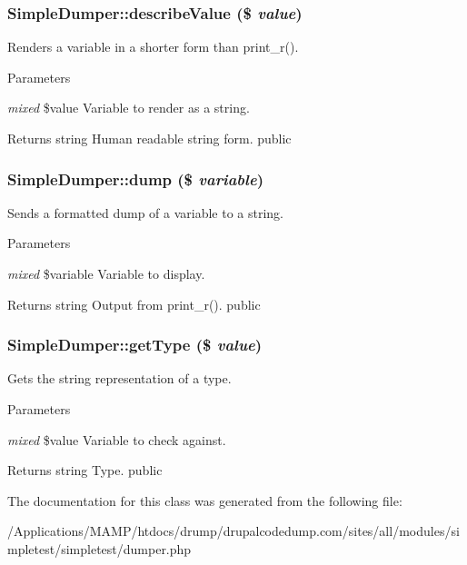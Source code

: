 \hypertarget{class_simple_dumper_a98625cdd0b0a6c6a79d241c61948d503}{
\subsubsection[{describeValue}]{\setlength{\rightskip}{0pt plus 5cm}SimpleDumper::describeValue (\$ {\em value})}}
\label{class_simple_dumper_a98625cdd0b0a6c6a79d241c61948d503}
Renders a variable in a shorter form than print\_\-r(). 
\begin{DoxyParams}{Parameters}
\item[{\em mixed}]\$value Variable to render as a string. \end{DoxyParams}
\begin{DoxyReturn}{Returns}
string Human readable string form.  public 
\end{DoxyReturn}
\hypertarget{class_simple_dumper_a7acdf399736c49015da241d4a4a2a55a}{
\subsubsection[{dump}]{\setlength{\rightskip}{0pt plus 5cm}SimpleDumper::dump (\$ {\em variable})}}
\label{class_simple_dumper_a7acdf399736c49015da241d4a4a2a55a}
Sends a formatted dump of a variable to a string. 
\begin{DoxyParams}{Parameters}
\item[{\em mixed}]\$variable Variable to display. \end{DoxyParams}
\begin{DoxyReturn}{Returns}
string Output from print\_\-r().  public 
\end{DoxyReturn}
\hypertarget{class_simple_dumper_a9227e45302efff30362ace986e212e0f}{
\subsubsection[{getType}]{\setlength{\rightskip}{0pt plus 5cm}SimpleDumper::getType (\$ {\em value})}}
\label{class_simple_dumper_a9227e45302efff30362ace986e212e0f}
Gets the string representation of a type. 
\begin{DoxyParams}{Parameters}
\item[{\em mixed}]\$value Variable to check against. \end{DoxyParams}
\begin{DoxyReturn}{Returns}
string Type.  public 
\end{DoxyReturn}


The documentation for this class was generated from the following file:\begin{DoxyCompactItemize}
\item 
/Applications/MAMP/htdocs/drump/drupalcodedump.com/sites/all/modules/simpletest/simpletest/dumper.php\end{DoxyCompactItemize}
